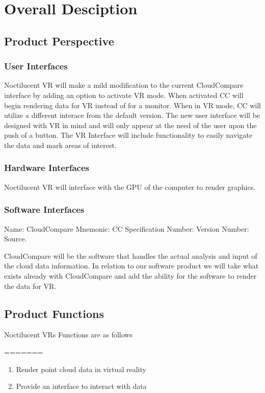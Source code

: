 \documentclass[titlepage]{article}
\begin{document}
\section{Overall Desciption}
\subsection{Product Perspective}

\subsubsection{User Interfaces}

Noctilucent VR will make a mild modification to the current CloudCompare interface by adding an option to activate VR mode. 
When activated CC will begin rendering data for VR instead of for a monitor.
When in VR mode, CC will utilize a different interace from the default version.
The new user interface will be designed with VR in mind and will only appear at the need of the user upon the push of a button.
The VR Interface will include functionality to easily navigate the data and mark areas of interest.

\subsubsection{Hardware Interfaces}

Noctilucent VR will interface with the GPU of the computer to render graphics.

\subsubsection{Software Interfaces}

Name: CloudCompare
Mnemonic: CC
Specification Number:
Version Number:
Source.

CloudCompare will be the software that handles the actual analysis and input of the cloud data information. 
In relation to our software product we will take what exists already with CloudCompare and add the ability for the software to render the data for VR.

\subsection{Product Functions}

Noctilucent VRs Functions are as follows

=======
\begin{enumerate}
\item Render point cloud data in virtual reality
\item Provide an interface to interact with data
\end{enumerate}
\end{document}
